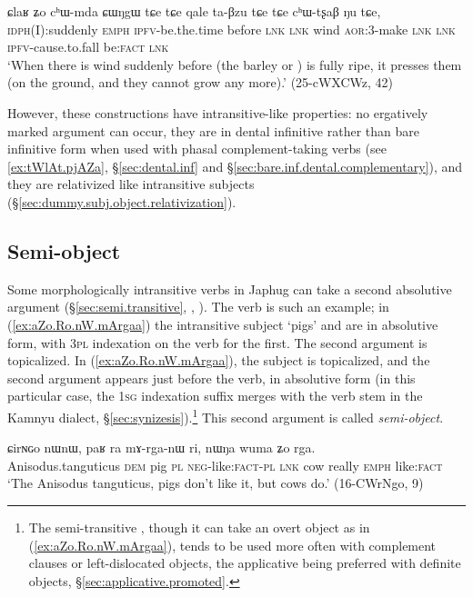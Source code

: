 \begin{exe}
\ex \label{ex:qale.taBzu}
 \gll ɕlaʁ ʑo cʰɯ-mda ɕɯŋgɯ tɕe tɕe qale ta-βzu tɕe tɕe cʰɯ-tʂaβ ŋu tɕe, \\
 \textsc{idph}(I):suddenly \textsc{emph} \textsc{ipfv}-be.the.time before  \textsc{lnk} \textsc{lnk} wind \textsc{aor}:3\flobv{}-make    \textsc{lnk} \textsc{lnk} \textsc{ipfv}-cause.to.fall be:\textsc{fact} \textsc{lnk} \\
 \glt `When there is wind suddenly before (the barley or ) is fully ripe, it presses them (on the ground, and they cannot grow any more).' (25-cWXCWz, 42)
\end{exe}

However, these constructions have intransitive-like properties: no ergatively marked argument can occur, they are in dental infinitive rather than bare infinitive form when used with phasal complement-taking verbs (see \ref{ex:tWlAt.pjAZa}, §\ref{sec:dental.inf} and §\ref{sec:bare.inf.dental.complementary}), and they are relativized like intransitive subjects (§\ref{sec:dummy.subj.object.relativization}).

\subsection{Semi-object} \label{sec:semi.object}
Some morphologically intransitive verbs in Japhug can take a second absolutive argument (§\ref{sec:semi.transitive}, \citealt[4--5]{jacques16relatives},  \citealt[224]{jacques16complementation}). The verb  is such an example; in (\ref{ex:aZo.Ro.nW.mArgaa}) the intransitive subject  `pigs' and  are in absolutive form, with  \textsc{3pl} indexation on the verb for the first. The second argument   is topicalized. In (\ref{ex:aZo.Ro.nW.mArgaa}), the subject is topicalized, and the second argument   appears just before the verb, in absolutive form (in this particular case, the \textsc{1sg} indexation suffix merges with the verb stem in the Kamnyu dialect, §\ref{sec:synizesis}).\footnote{The semi-transitive , though it can take an overt object as in  (\ref{ex:aZo.Ro.nW.mArgaa}), tends to be used more often with complement clauses or left-dislocated objects, the applicative  being preferred with definite objects, §\ref{sec:applicative.promoted}.} This second argument is called \textit{semi-object}.

\begin{exe}
\ex \label{ex:paR.ra.mArganW}
\gll ɕirɴɢo nɯnɯ, paʁ ra mɤ-rga-nɯ ri, nɯŋa wuma ʑo rga.\\
Anisodus.tanguticus \textsc{dem} pig \textsc{pl} \textsc{neg}-like:\textsc{fact}-\textsc{pl} \textsc{lnk} cow really \textsc{emph} like:\textsc{fact} \\
\glt `The Anisodus tanguticus, pigs don't like it, but cows do.' (16-CWrNgo, 9)
\end{exe}

